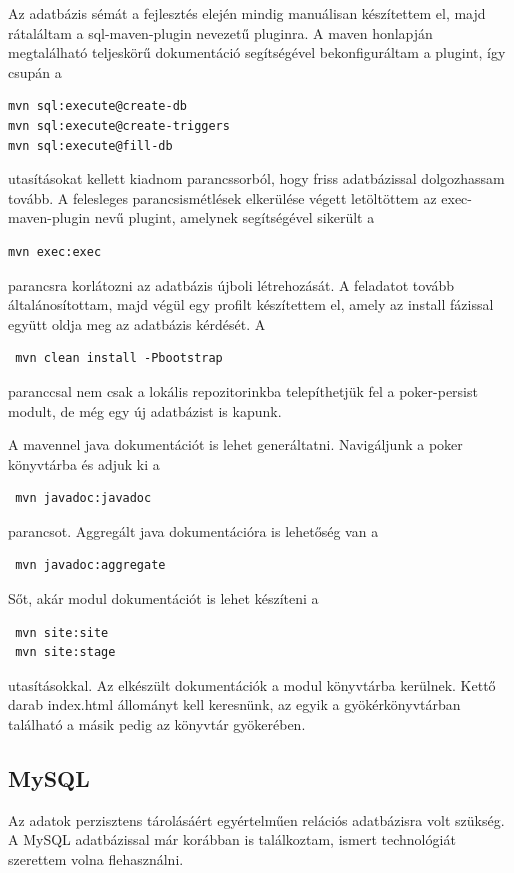 Az adatbázis sémát a fejlesztés elején mindig manuálisan készítettem el, majd rátaláltam a sql-maven-plugin nevezetű pluginra. A maven honlapján megtalálható teljeskörű dokumentáció segítségével bekonfiguráltam a plugint, így csupán a
 \begin{verbatim}
mvn sql:execute@create-db
mvn sql:execute@create-triggers
mvn sql:execute@fill-db
\end{verbatim}
utasításokat kellett kiadnom parancssorból, hogy friss adatbázissal dolgozhassam tovább. A felesleges parancsismétlések elkerülése végett letöltöttem az exec-maven-plugin nevű plugint, amelynek segítségével sikerült a 
 \begin{verbatim}
mvn exec:exec
\end{verbatim}
parancsra korlátozni az adatbázis újboli létrehozását. A feladatot tovább általánosítottam, majd végül egy profilt készítettem el, amely az install fázissal együtt oldja meg az adatbázis kérdését. A 
 \begin{verbatim}
 mvn clean install -Pbootstrap
 \end{verbatim}
paranccsal nem csak a lokális repozitorinkba telepíthetjük fel a poker-persist modult, de még egy új adatbázist is kapunk.

A mavennel java dokumentációt is lehet generáltatni. Navigáljunk a poker könyvtárba és adjuk ki a
\begin{verbatim}
 mvn javadoc:javadoc
\end{verbatim}
 parancsot. Aggregált java dokumentációra is lehetőség van a 
 \begin{verbatim}
 mvn javadoc:aggregate
\end{verbatim}
 Sőt, akár modul dokumentációt is lehet készíteni a 
\begin{verbatim}
 mvn site:site
 mvn site:stage
\end{verbatim}
utasításokkal. Az elkészült dokumentációk a modul  könyvtárba kerülnek. Kettő darab index.html állományt kell keresnünk, az egyik a gyökérkönyvtárban található a másik pedig az  könyvtár gyökerében.
 
\subsection{MySQL}
Az adatok perzisztens tárolásáért egyértelműen relációs adatbázisra volt szükség. A MySQL adatbázissal már korábban is találkoztam, ismert technológiát szerettem volna flehasználni.

